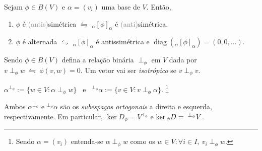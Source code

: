 
\begin{proposition}
    Sejam \(\phi \in B(V)\) e \(\alpha = (v_i)\) uma base de \(V\). Então, 
    \vspace{-0.2cm}
    \begin{enumerate}[label = (\alph*), left = 0.6cm]
        \item \(\phi \) é \textcolor{gray}{(antis)}simétrica \(\leftrightharpoons\) \(_\alpha [\phi]_\alpha\) é \textcolor{gray}{(anti)}simétrica.
        \item \(\phi \) é alternada \(\leftrightharpoons\) \(_\alpha [\phi]_\alpha\) é antissimétrica e \(\operatorname{diag}(_\alpha[\phi]_\alpha) = (0, 0, \ldots)\).%
    \end{enumerate}
\end{proposition}

\begin{definition}
    Sendo \(\phi \in B(V)\) defina a relação binária \(\perp_\phi\) em \(V\) dada por \(v \perp_\phi w\ \leftrightharpoons \ \phi(v,w)=0\). Um vetor vai ser \emph{isotrópico} se \(v\perp_\phi v \). %
\end{definition}


\begin{definition}
    \centering
    \(\alpha^{\perp_\phi} := \{w \in V:  \alpha \perp_\phi w\}\) \ e \  \(^{\perp_\phi}\alpha := \{v \in V: v \perp_\phi \alpha\}\). \footnote{Sendo \(\alpha = (v_i)\) entenda-se \(\alpha \perp_\phi w\) como os \(w \in V : \forall i \in I,\ v_i \perp_\phi w\).}
\end{definition}

\begin{note}
    Ambos \(\alpha^{\perp_\phi}\) e \(^{\perp_\phi}\alpha\) são os \emph{subespaços ortogonais} a direita e esquerda, respectivamente. Em particular, \(\ker D_\phi = V^{\perp_\phi}\) e \(\ker  {_\phi D} = \hspace{0.1cm}^{\perp_\phi}V\).
\end{note}

